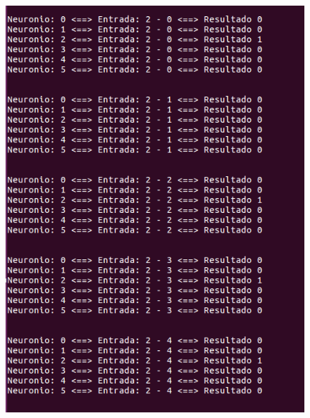 \documentclass[hidelinks,12pt]{article}
\begin{document}
		\begin{figure}[!h]
			\centering
			\includegraphics[scale=0.5]{Figures/E3S2P1R.png}
		\end{figure}
		
\end{document}
